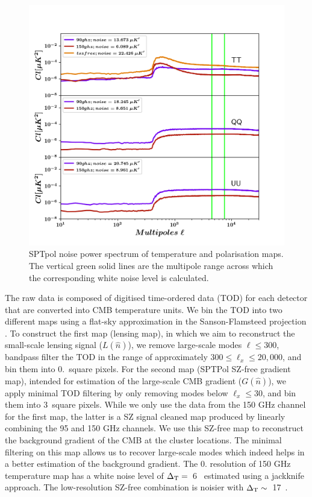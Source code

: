 \begin{figure}[!ht]
\includegraphics[width= \columnwidth]{figs/noise_Cls_sanjay_maps_20170603.png}
\caption{SPTpol noise power spectrum of temperature and polarisation maps. The vertical green solid lines are the multipole range across which the corresponding white noise level is calculated.}
\label{noise_ps}
\end{figure}

The raw data is composed of digitised time-ordered data (TOD) for each detector that are converted into CMB temperature units. %
We bin the TOD into two different maps using a flat-sky approximation in the Sanson-Flamsteed projection \citep{calabretta02, schaffer11}. 
To construct the first map (lensing map), in which we aim to reconstruct the small-scale lensing signal ($L(\hat{n})$), we remove large-scale modes $\ell \le 300$, bandpass filter the TOD in the range of approximately $300 \le \ell_{x} \le 20,000$, and bin them into 0.\ square pixels.
For the second map (SPTPol SZ-free gradient map), intended for estimation of the large-scale CMB gradient ($G(\hat{n})$), we apply minimal TOD filtering by only removing modes below $\ell_{x} \le 30$, and bin them into 3\am\ square pixels.
While we only use the data from the 150 GHz channel for the first map, the latter is a SZ signal cleaned map produced by linearly combining the 95 and 150 GHz channels. 
We use this SZ-free map to reconstruct the background gradient of the CMB at the cluster locations.
The minimal filtering on this map allows us to recover large-scale modes which indeed helps in a better estimation of the background gradient.
The 0. resolution of 150 GHz temperature map has a white noise level of \mbox{$\Delta_{\rm T} = $ 6 \ukam} estimated using a jackknife approach. %
The low-resolution SZ-free combination is noisier with \mbox{$\Delta_{\rm T} \sim $ 17 \ukam}.

